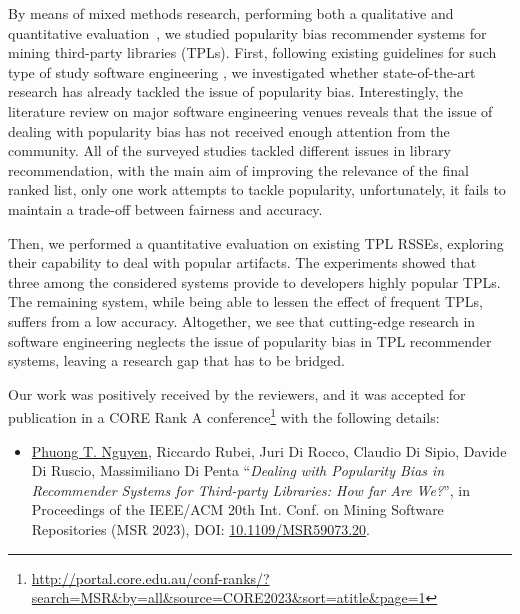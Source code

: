 By means of mixed methods research, \ie performing both a qualitative and quantitative evaluation~\cite{10174041}, we studied popularity bias recommender systems for mining third-party libraries (TPLs). %
First, following existing guidelines for such type of study software engineering \cite{KitchenhamBLBB11}, we investigated whether state-of-the-art research has already tackled the issue of popularity bias. %
Interestingly, the literature review on major software engineering venues reveals that the issue of dealing with popularity bias has not received enough attention from the community. All of the surveyed studies tackled different issues in library recommendation, with the main aim of improving the relevance of the final ranked list, %
only one work attempts to tackle popularity, unfortunately, it fails to maintain a trade-off between fairness and accuracy. %

Then, we performed a quantitative evaluation on \numSys existing TPL RSSEs, exploring their capability to deal with %
popular artifacts. %
The experiments showed that three among the considered systems provide to developers highly popular TPLs. The remaining system, while being able to lessen the effect of frequent TPLs, suffers from a low accuracy. Altogether, we see that cutting-edge research in software engineering neglects the issue of popularity bias in TPL recommender systems, leaving a research gap that has to be %
bridged.


Our work was positively received by the reviewers, and it was accepted for publication in a CORE Rank A conference\footnote{\url{http://portal.core.edu.au/conf-ranks/?search=MSR&by=all&source=CORE2023&sort=atitle&page=1}} with the following details: %
\begin{itemize}
	\item \small{\underline{Phuong T. Nguyen}, Riccardo Rubei, Juri Di Rocco, Claudio Di Sipio, Davide Di Ruscio, Massimiliano Di Penta ``\emph{Dealing with Popularity Bias in Recommender Systems for Third-party Libraries: How far Are We?}'', in Proceedings of the IEEE/ACM 20th Int. Conf. on Mining Software Repositories (MSR 2023), %
		DOI: \href{https://doi.org/10.1109/MSR59073.2023.00016}{10.1109/MSR59073.20}.}
\end{itemize}


